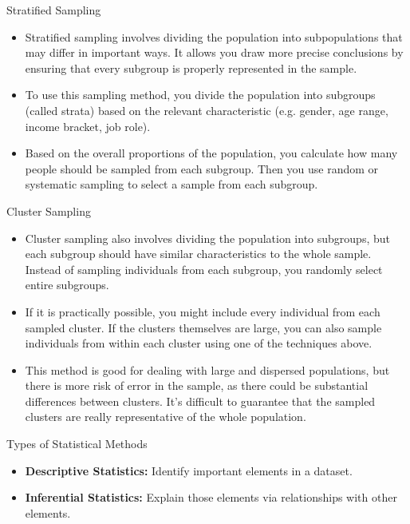 \documentclass[10pt,dvipsnames, aspectratio=169]{beamer}
\begin{document}
\begin{frame}[t]{ Stratified Sampling}
	\begin{itemize}
		\item Stratified sampling involves dividing the population into 
		subpopulations that may differ in important ways. It allows you draw 
		more precise conclusions by ensuring that every subgroup is properly 
		represented in the sample.
		\item To use this sampling method, you divide the population into 
		subgroups (called strata) based on the relevant characteristic (e.g. 
		gender, age range, income bracket, job role).
		\item Based on the overall proportions of the population, you calculate 
		how many people should be sampled from each subgroup. Then you use 
		random or systematic sampling to select a sample from each subgroup.
	\end{itemize}
\end{frame}

\begin{frame}[t]{Cluster Sampling}
	\begin{itemize}
		\item Cluster sampling also involves dividing the population into 
		subgroups, but each subgroup should have similar characteristics to the 
		whole sample. Instead of sampling individuals from each subgroup, you 
		randomly select entire subgroups.
		\item If it is practically possible, you might include every individual 
		from each sampled cluster. If the clusters themselves are large, you 
		can also sample individuals from within each cluster using one of the 
		techniques above.
		\item This method is good for dealing with large and dispersed 
		populations, but there is more risk of error in the sample, as there 
		could be substantial differences between clusters. It’s difficult to 
		guarantee that the sampled clusters are really representative of the 
		whole population.
	\end{itemize}
\end{frame}

\begin{frame}[t]{Types of Statistical Methods}
	\begin{itemize}
		\item \textbf{Descriptive Statistics:} Identify important elements in a
		dataset.
		\item \textbf{Inferential Statistics:} Explain those elements via
		relationships with other elements.
	\end{itemize}
\end{frame}
\end{document}
